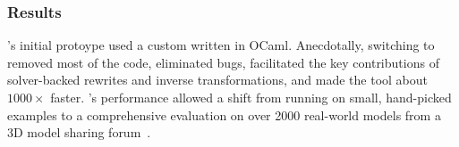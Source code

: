 \subsubsection{Results}
\sz's initial protoype used a custom \egraph written in OCaml.
Anecdotally, switching to \egg
  removed most of the code,
  eliminated bugs,
  facilitated the key contributions of solver-backed rewrites and inverse transformations,
  and made the tool about $1000 \times$ faster.
\egg's performance allowed a shift from running on small, hand-picked
  examples to a comprehensive evaluation on over 2000 real-world models from
  a 3D model sharing forum~\cite{szalinski}.



